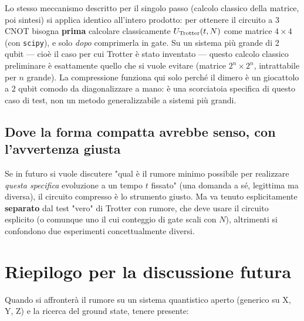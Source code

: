 \documentclass[11pt,a4paper]{article}
\begin{document}
Lo stesso meccanismo descritto per il singolo passo (calcolo classico
della matrice, poi sintesi) si applica identico all'intero prodotto:
per ottenere il circuito a 3 CNOT bisogna \textbf{prima} calcolare
classicamente $U_{\rm Trotter}(t,N)$ come matrice $4\times4$ (con
\texttt{scipy}), e solo \emph{dopo} comprimerla in gate. Su un sistema
più grande di 2 qubit --- cioè il caso per cui Trotter è stato
inventato --- questo calcolo classico preliminare è esattamente quello
che si vuole evitare (matrice $2^n\times2^n$, intrattabile per $n$
grande). La compressione funziona qui solo perché il dimero è un
giocattolo a 2 qubit comodo da diagonalizzare a mano: è una
scorciatoia specifica di questo caso di test, non un metodo
generalizzabile a sistemi più grandi.

\subsection*{Dove la forma compatta avrebbe senso, con l'avvertenza giusta}

Se in futuro si vuole discutere "qual è il rumore minimo possibile per
realizzare \emph{questa specifica} evoluzione a un tempo $t$ fissato"
(una domanda a sé, legittima ma diversa), il circuito compresso è lo
strumento giusto. Ma va tenuto esplicitamente \textbf{separato} dal
test "vero" di Trotter con rumore, che deve usare il circuito esplicito
(o comunque uno il cui conteggio di gate scali con $N$), altrimenti si
confondono due esperimenti concettualmente diversi.

\section{Riepilogo per la discussione futura}

Quando si affronterà il rumore su un sistema quantistico aperto
(generico su X, Y, Z) e la ricerca del ground state, tenere presente:
\end{document}
